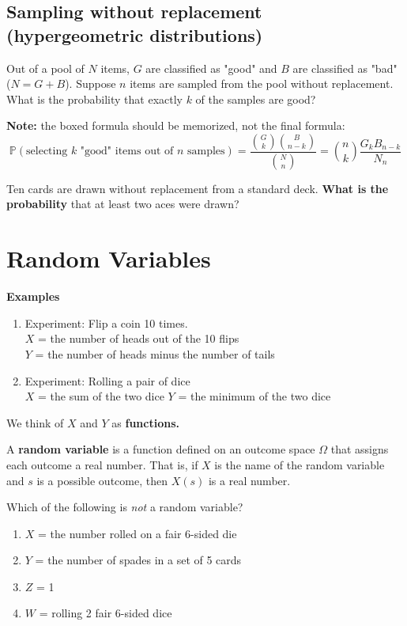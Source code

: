\documentclass[titlepage, 12pt, leqno]{article}
\begin{document}
\subsection{Sampling without replacement (hypergeometric distributions)}
Out of a pool of $N$ items, $G$ are classified as "good" and $B$ are classified as "bad" ($N = G + B$). Suppose $n$ items are sampled from the pool without replacement. What is the probability that exactly $k$ of the samples are good?

\textbf{Note:} the boxed formula should be memorized, not the final formula:
\[
    \mathbb{P}( \text{selecting }k \text{ "good" items out of } n \text{ samples}) = \boxed{\frac{\binom{G}{k}\binom{B}{n-k}}{\binom{N}{n}}} = \binom{n}{k}\frac{G_kB_{n-k}}{N_n}  
\]
\begin{ex}
    Ten cards are drawn without replacement from a standard deck. \textbf{What is the probability}  that at least two aces were drawn?
\end{ex}

\pagebreak
\section{Random Variables}
\textbf{Examples} 
\begin{enumerate}
    \item Experiment: Flip a coin 10 times.\\[.1in]
        $X$ = the number of heads out of the 10 flips\\
        $Y$ = the number of heads minus the number of tails
    \item Experiment: Rolling a pair of dice \\[.1in]
        $X$ = the sum of the two dice
        $Y$ = the minimum of the two dice
\end{enumerate}

We think of $X$ and $Y$ as \textbf{functions.} 

\begin{definition}
    A \textbf{random variable} is a function defined on an outcome space $\Omega $ that assigns each outcome a real number. That is, if $X$ is the name of the random variable and $s$ is a possible outcome, then $X(s)$ is a real number.
\end{definition}

\begin{ex}
    Which of the following is \textit{not} a random variable?
    \begin{enumerate}
        \item $X$ = the number rolled on a fair 6-sided die
        \item $Y$ = the number of spades in a set of 5 cards
        \item $Z$ = 1
        \item $W$ = rolling 2 fair 6-sided dice
    \end{enumerate}
\end{ex}
\end{document}
